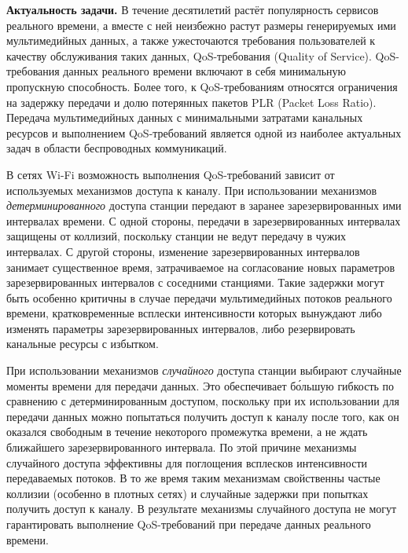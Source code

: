 
\textbf{Актуальность задачи.} В течение десятилетий растёт популярность сервисов реального времени, а вместе с ней неизбежно растут размеры генерируемых ими мультимедийных данных, а также ужесточаются требования пользователей к качеству обслуживания таких данных, QoS-требования (Quality of Service). QoS-требования данных реального времени включают в себя минимальную пропускную способность. Более того, к QoS-требованиям относятся ограничения на задержку передачи и долю потерянных пакетов PLR (Packet Loss Ratio). Передача мультимедийных данных с минимальными затратами канальных ресурсов и выполнением QoS-требований является одной из наиболее актуальных задач в области беспроводных коммуникаций.

В сетях Wi-Fi возможность выполнения QoS-требований зависит от используемых механизмов доступа к каналу. При использовании механизмов \textit{детерминированного} доступа станции передают в заранее зарезервированных ими интервалах времени. С одной стороны, передачи в зарезервированных интервалах защищены от коллизий, поскольку станции не ведут передачу в чужих интервалах. С другой стороны, изменение зарезервированных интервалов занимает существенное время, затрачиваемое на согласование новых параметров зарезервированных интервалов с соседними станциями. Такие задержки могут быть особенно критичны в случае передачи мультимедийных потоков реального времени, кратковременные всплески интенсивности которых вынуждают либо изменять параметры зарезервированных интервалов, либо резервировать канальные ресурсы с избытком.

При использовании механизмов \textit{случайного} доступа станции выбирают случайные моменты времени для передачи данных. Это обеспечивает б\'{о}льшую гибкость по сравнению с детерминированным доступом, поскольку при их использовании для передачи данных можно попытаться получить доступ к каналу после того, как он оказался свободным в течение некоторого промежутка времени, а не ждать ближайшего зарезервированного интервала. По этой причине механизмы случайного доступа эффективны для поглощения всплесков интенсивности передаваемых потоков. В то же время таким механизмам свойственны частые коллизии (особенно в плотных сетях) и случайные задержки при попытках получить доступ к каналу. В результате механизмы случайного доступа не могут гарантировать выполнение QoS-требований при передаче данных реального времени. 

